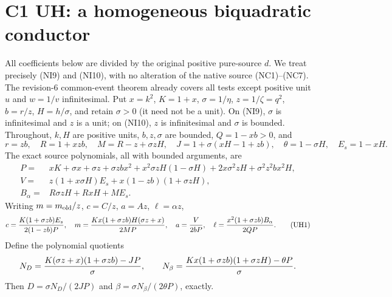 \section{C1 UH: a homogeneous biquadratic conductor}
\label{sec:r7-c1-uh}
All coefficients below are divided by the original positive pure-source
$d$. We treat precisely (NI9) and (NI10), with no alteration of the native
source (NC1)--(NC7). The revision-6 common-event theorem already covers
all tests except positive unit $u$ and $w=1/v$ infinitesimal.
Put $x=k^2$, $K=1+x$, $\sigma=1/\eta$, $z=1/\zeta=q^2$,
$b=r/z$, $H=h/\sigma$, and retain $\sigma>0$ (it need not be a unit).
On (NI9), $\sigma$ is infinitesimal and $z$ is a unit; on (NI10),
$z$ is infinitesimal and $\sigma$ is bounded. Throughout, $k,H$ are
positive units, $b,z,\sigma$ are bounded, $Q=1-xb>0$, and
\[
 r=zb,\quad R=1+xzb,\quad M=R-z+\sigma zH,
 \quad J=1+\sigma(xH-1+zb),\quad\theta=1-\sigma H,
 \quad E_s=1-xH.
\]
The exact source polynomials, all with bounded arguments, are
\begin{align*}
 P={}&xK+\sigma x+\sigma z+\sigma zb x^2
 +x^2\sigma zH(1-\sigma H)+2x\sigma^2zH
 +\sigma^2z^2bx^2H,\\
 V={}&z(1+x\sigma H)E_s+x(1-zb)(1+\sigma zH),\\
 B_\alpha={}&R\sigma zH+RxH+ME_s.
\end{align*}
Writing $m=m_{\rm old}/z$, $c=C/z$, $a=Az$, $\ell=\alpha z$,
\[
 c={K(1+\sigma zb)E_s\over2(1-zb)P},\quad
 m={Kx(1+\sigma zb)H(\sigma z+x)\over2MP},\quad
 a={V\over2bP},\quad
 \ell={x^2(1+\sigma zb)B_\alpha\over2QP}.                 \tag{UH1}
\]
Define the polynomial quotients
\[
 N_D={K(\sigma z+x)(1+\sigma zb)-JP\over\sigma},\qquad
 N_\beta={Kx(1+\sigma zb)(1+\sigma zH)-\theta P\over\sigma}.
\]
Then $D=\sigma N_D/(2JP)$ and
$\beta=\sigma N_\beta/(2\theta P)$, exactly.

